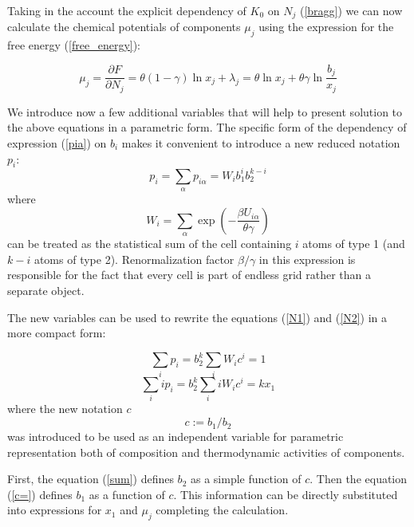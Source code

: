 \documentclass[12pt,abstract]{scrartcl}
\begin{document}
Taking in the account the explicit dependency of $K_0$ on $N_j$ (\ref{bragg}) we can now calculate the chemical potentials of components $\mu_j$ using the expression for the free energy (\ref{free_energy}):

\begin{equation} \label{chim_pot}
    \mu_j = \frac{\partial F}{\partial N_j} =  \theta (1 - \gamma) \ln x_j + \lambda_j = \theta \ln x_j + \theta \gamma \ln \frac{b_j}{x_j}
\end{equation}

We introduce now a few additional variables that will help to present solution to the above equations in a parametric form.
The specific form of the dependency of expression (\ref{pia}) on $b_i$ makes it convenient to introduce a new reduced notation $p_i$:
\begin{equation} \label{pi}
    p_i = \sum_\alpha p_{i \alpha} = W_i b_1^i b_2^{k-i}
\end{equation}
where
\begin{equation} \label{Wi}
    W_i = \sum_\alpha \exp \left(- {\frac{\beta U_{i \alpha}}{\theta\gamma }}\right)
\end{equation}
can be treated as the statistical sum \cite{Hill1956}
of the cell containing $i$ atoms of type 1 (and $k-i$ atoms of type 2). Renormalization factor $\beta / \gamma$ in this expression is responsible for the fact that every cell is part of endless grid rather than a separate object.

The new variables can be used to rewrite the equations (\ref{N1}) and (\ref{N2}) in a more compact form:


\begin{equation} \label{sum}
    \sum_i p_i = b_2^k \sum_i W_i c^i = 1 
\end{equation}
\begin{equation} \label{sumx1}
    \sum_i i p_i = b_2^k \sum_i i W_i c^i = k x_1 
\end{equation}
where the new notation $c$ 
\begin{equation} \label{c=}
    c := b_1 / b_2
\end{equation}
was introduced to be used as an independent variable for parametric representation both of composition and thermodynamic activities of components.


First, the equation (\ref{sum}) defines $b_2$ as a simple  function of $c$. Then the equation (\ref{c=}) defines $b_1$ as a function of $c$. This information can be directly substituted into expressions for $x_1$ and $\mu_j$ completing the calculation.
\end{document}
